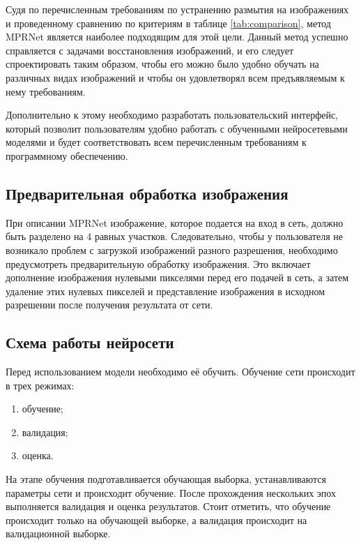 Судя по перечисленным требованиям по устранению размытия на изображениях и проведенному сравнению по критериям в таблице \ref{tab:comparison}, метод MPRNet является наиболее подходящим для этой цели. Данный метод успешно справляется с задачами восстановления изображений, и его следует спроектировать таким образом, чтобы его можно было удобно обучать на различных видах изображений и чтобы он удовлетворял всем предъявляемым к нему требованиям.

Дополнительно к этому необходимо разработать пользовательский интерфейс, который позволит пользователям удобно работать с обученными нейросетевыми моделями и будет соответствовать всем перечисленным требованиям к программному обеспечению.

\subsection{Предварительная обработка изображения}

При описании MPRNet изображение, которое подается на вход в сеть, должно быть разделено на 4 равных участков. Следовательно, чтобы у пользователя не возникало проблем с загрузкой изображений разного разрешения, необходимо предусмотреть предварительную обработку изображения. Это включает дополнение изображения нулевыми пикселями перед его подачей в сеть, а затем удаление этих нулевых пикселей и представление изображения в исходном разрешении после получения результата от сети.


\subsection{Схема работы нейросети}

Перед использованием модели необходимо её обучить. Обучение сети происходит в трех режимах:

\begin{enumerate}[left=0.49cm]
	\item обучение;
	\item валидация;
	\item оценка.
\end{enumerate}

На этапе обучения подготавливается обучающая выборка, устанавливаются параметры сети и происходит обучение. После прохождения нескольких эпох выполняется валидация и оценка результатов. Стоит отметить, что обучение происходит только на обучающей выборке, а валидация происходит на валидационной выборке.

